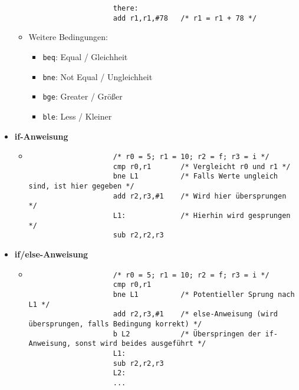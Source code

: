 \begin{itemize}
\begin{itemize}
\begin{verbatim}
                    there:
                    add r1,r1,#78   /* r1 = r1 + 78 */
                    \end{verbatim}
                \item Weitere Bedingungen: 
                    \begin{itemize}
                        \item \texttt{beq}: Equal / Gleichheit 
                        \item \texttt{bne}: Not Equal / Ungleichheit
                        \item \texttt{bge}: Greater / Größer
                        \item \texttt{ble}: Less / Kleiner
                    \end{itemize}
            \end{itemize}
        
        \item \textbf{if-Anweisung}
            \begin{itemize}
                \item[]
                    \begin{verbatim}
                    /* r0 = 5; r1 = 10; r2 = f; r3 = i */
                    cmp r0,r1       /* Vergleicht r0 und r1 */ 
                    bne L1          /* Falls Werte ungleich sind, ist hier gegeben */
                    add r2,r3,#1    /* Wird hier übersprungen */
                    L1:             /* Hierhin wird gesprungen */
                    sub r2,r2,r3 
                    \end{verbatim}
            \end{itemize}

        \item \textbf{if/else-Anweisung}
            \begin{itemize}
                \item[]
                    \begin{verbatim}
                    /* r0 = 5; r1 = 10; r2 = f; r3 = i */
                    cmp r0,r1 
                    bne L1          /* Potentieller Sprung nach L1 */
                    add r2,r3,#1    /* else-Anweisung (wird übersprungen, falls Bedingung korrekt) */
                    b L2            /* Überspringen der if-Anweisung, sonst wird beides ausgeführt */
                    L1:
                    sub r2,r2,r3 
                    L2:
                    ...
                    \end{verbatim}
            \end{itemize}


\end{itemize}
